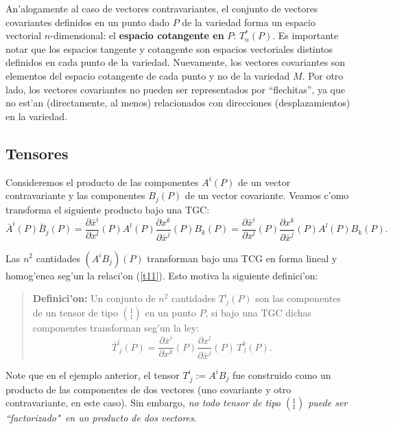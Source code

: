 An'alogamente al caso de vectores contravariantes, el conjunto de vectores
covariantes definidos en un punto dado $P$ de la variedad forma un espacio
vectorial $n$-dimensional: el \textbf{espacio cotangente en} $P$: $T_n^*(P)$. Es
importante notar que los espacios tangente y cotangente son espacios
vectoriales distintos definidos en cada punto de la variedad. Nuevamente, los
vectores covariantes son elementos del espacio cotangente de cada punto y no de la variedad $M$. Por otro lado, los vectores covariantes no pueden ser representados por ``flechitas'', ya que no est'an (directamente, al menos) relacionados con direcciones (desplazamientos) en la variedad.


\subsection{Tensores}
Consideremos el producto de las componentes $A^i (P)$ de un vector
contravariante y las componentes $B_j(P)$ de un vector covariante. Veamos
c'omo transforma el siguiente producto bajo una TGC:
\begin{equation}
\bar{A}^i (P)\bar{B}_j (P)=\frac{\partial\bar{x}^i }{\partial x^l }(P)A^l (P)
\frac{\partial x^k }{\partial\bar{x}^j }(P)B_k(P)=\frac{\partial\bar{x}^i 
}{\partial x^l }(P)\frac{\partial x^k }{\partial\bar{x}^j }(P)A^l (P)B_k(P).
\label{t11}
\end{equation}

Las $n^2$ cantidades $(A^i B_j)(P)$ transforman bajo una TCG en forma lineal y homog'enea seg'un la relaci'on (\ref{t11}). Esto motiva la siguiente definici'on:
\begin{quotation}
\textbf{Definici'on:} Un conjunto de $n^2$ cantidades $T_{\ j}^i (P)$ son las
componentes de un tensor de tipo $(^1_1)$ en un punto $P$, si bajo una TGC
dichas componentes transforman seg'un la ley:
\begin{equation}
\boxed{\bar{T}_{\ j}^i (P)=\frac{\partial\bar{x}^i }{\partial
x^k}(P)\frac{\partial x^l }{\partial\bar{x}^j}(P)\,T_{\ l}^k(P).} \label{t12}
\end{equation}
\end{quotation}

Note que en el ejemplo anterior, el tensor $T^i_{\ j}:=A^i B_j$ fue construido como un producto de las componentes de dos vectores (uno covariante y otro contravariante, en este caso). Sin embargo, \textit{no todo tensor de tipo $(^1_1)$ puede ser ``factorizado"\, en un producto de dos vectores}.

